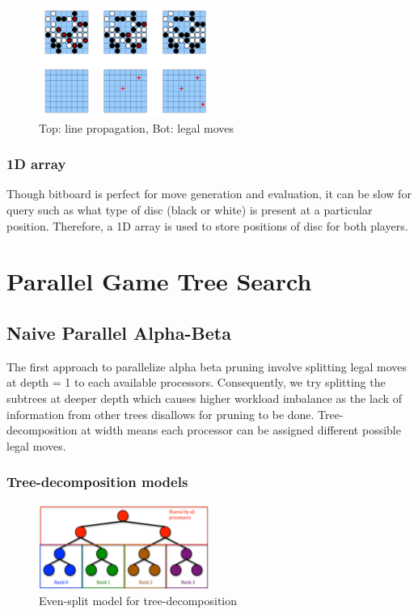\documentclass[12pt]{article}
\begin{document}
\begin{figure}[H]
  \centering
  \includegraphics[width=0.5\textwidth, height=0.3\textwidth]{bitboard_legalmoves.png}
  \caption{Top: line propagation, Bot: legal moves}
  \label{fig:bitboard_legalmoves}
\end{figure}

\subsubsection{1D array}

Though bitboard is perfect for move generation and evaluation, it can be slow
for query such as what type of disc (black or white) is present at a particular
position. Therefore, a 1D array is used to store positions of disc for both players.


\section{Parallel Game Tree Search}

\subsection{Naive Parallel Alpha-Beta}

The first approach to parallelize alpha beta pruning involve splitting legal
moves at depth = 1 to each available processors. Consequently, we try splitting
the subtrees at deeper depth which causes higher workload imbalance as the lack
of information from other trees disallows for pruning to be done.
Tree-decomposition at width means each processor can be assigned different
possible legal moves.

\subsubsection{Tree-decomposition models}

\begin{figure}[H]
  \centering
  \includegraphics[width=0.5\textwidth, height=0.3\textwidth]{parallel_depth.png}
  \caption{Even-split model for tree-decomposition}
  \label{fig:parallel_depth}
\end{figure}
\end{document}
